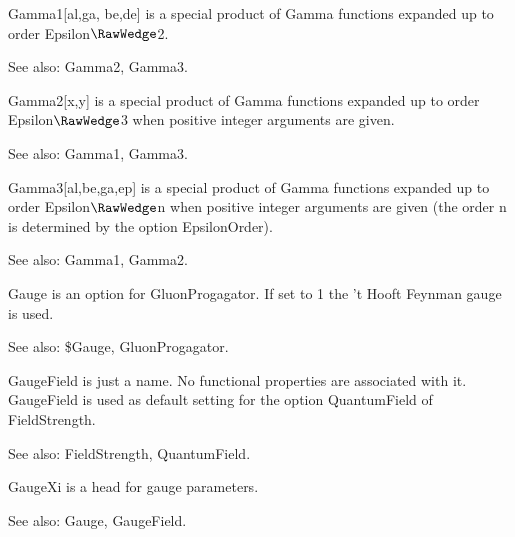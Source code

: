 Gamma1[al,ga, be,de] is a special product of Gamma functions expanded up to order Epsilon\(\RawWedge\)2.

See also:  Gamma2, Gamma3.



Gamma2[x,y] is a special product of Gamma functions expanded up to order Epsilon\(\RawWedge\)3 when positive integer arguments are given.

See also:  Gamma1, Gamma3.



Gamma3[al,be,ga,ep] is a special product of Gamma functions expanded up to order Epsilon\(\RawWedge\)n when positive integer arguments
  are given (the order n is determined by the option EpsilonOrder).

See also:  Gamma1, Gamma2.



Gauge is an option for GluonProgagator. If set to 1 the 't Hooft Feynman gauge is used.

See also:  \${}Gauge, GluonProgagator.



GaugeField is just a name. No functional properties are associated with it. GaugeField is used as default setting for the option
  QuantumField of FieldStrength.

See also:  FieldStrength, QuantumField.








GaugeXi is a head for gauge parameters.

See also:  Gauge, GaugeField.

